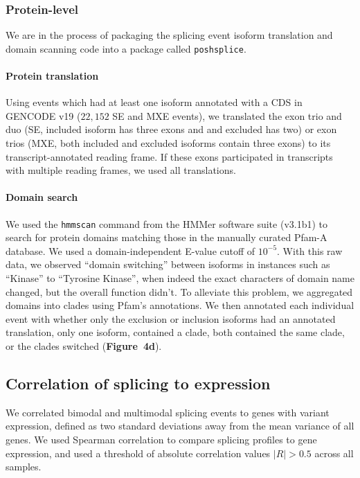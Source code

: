 \subsubsection{Protein-level}

We are in the process of packaging the splicing event isoform translation and domain scanning code into a package called \texttt{poshsplice}\cite{Anonymous:uj}.

\paragraph{Protein translation}
Using events which had at least one isoform annotated with a CDS in GENCODE v19 ($22,152$ SE and MXE events), we translated the exon trio and duo (SE, included isoform has three exons and and excluded has two) or exon trios (MXE, both included and excluded isoforms contain three exons) to its transcript-annotated reading frame. If these exons participated in transcripts with multiple reading frames, we used all translations.

\paragraph{Domain search} We used the \texttt{hmmscan} command from the HMMer\cite{Finn:2011eg,Eddy:1998ut} software suite (v3.1b1) to search for protein domains matching those in the manually curated Pfam-A database\cite{Finn:2016bf}. We used a domain-independent E-value cutoff of $10^{-5}$. With this raw data, we observed ``domain switching'' between isoforms in instances such as ``Kinase'' to ``Tyrosine Kinase'', when indeed the exact characters of domain name changed, but the overall function didn't. To alleviate this problem, we aggregated domains into clades using Pfam's annotations. We then annotated each individual event with whether only the exclusion or inclusion isoforms had an annotated translation, only one isoform, contained a clade, both contained the same clade, or the clades switched (\textbf{Figure~4d}).

\subsection{Correlation of splicing to expression}
We correlated bimodal and multimodal splicing events to genes with variant expression, defined as two standard deviations away from the mean variance of all genes. We used Spearman correlation to compare splicing profiles to gene expression, and used a threshold of absolute correlation values $|R| > 0.5$ across all samples.

